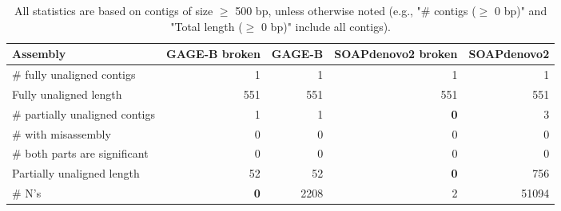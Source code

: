 \documentclass[12pt,a4paper]{article}
\begin{document}
\begin{table}[ht]
\begin{center}
\caption{All statistics are based on contigs of size $\geq$ 500 bp, unless otherwise noted (e.g., "\# contigs ($\geq$ 0 bp)" and "Total length ($\geq$ 0 bp)" include all contigs).}
\begin{tabular}{|l*{4}{|r}|}
\hline
Assembly & GAGE-B broken & GAGE-B & SOAPdenovo2 broken & SOAPdenovo2 \\ \hline
\# fully unaligned contigs & 1 & 1 & 1 & 1 \\ \hline
Fully unaligned length & 551 & 551 & 551 & 551 \\ \hline
\# partially unaligned contigs & 1 & 1 & {\bf 0} & 3 \\ \hline
\hspace{5mm}\# with misassembly & 0 & 0 & 0 & 0 \\ \hline
\hspace{5mm}\# both parts are significant & 0 & 0 & 0 & 0 \\ \hline
Partially unaligned length & 52 & 52 & {\bf 0} & 756 \\ \hline
\# N's & {\bf 0} & 2208 & 2 & 51094 \\ \hline
\end{tabular}
\end{center}
\end{table}
\end{document}
